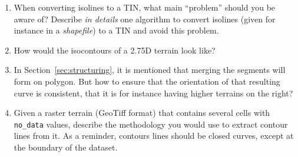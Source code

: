 \begin{enumerate}
  \item When converting isolines to a TIN, what main ``problem'' should you be aware of? Describe \emph{in details} one algorithm to convert isolines (given for instance in a \emph{shapefile}) to a TIN and avoid this problem.
  \item How would the isocontours of a 2.75D terrain look like?
  \item In Section~\ref{sec:structuring}, it is mentioned that merging the segments will form on polygon. But how to ensure that the orientation of that resulting curve is consistent, that it is for instance having higher terrains on the right?
  \item Given a raster terrain (GeoTiff format) that contains several cells with \texttt{no\_data} values, describe the methodology you would use to extract contour lines from it. As a reminder, contours lines should be closed curves, except at the boundary of the dataset.
\end{enumerate}